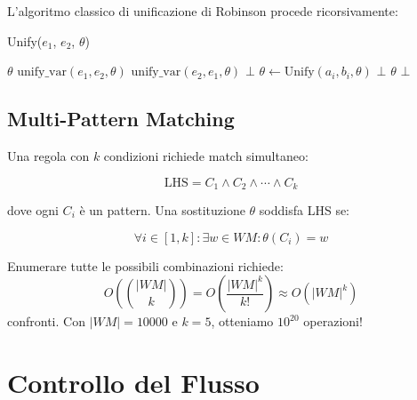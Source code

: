 L'algoritmo classico di unificazione di Robinson procede ricorsivamente:

\begin{algorithm}[H]
\caption{Unify($e_1$, $e_2$, $\theta$)}
\begin{algorithmic}[1]
    \State \Return $\theta$ 
    \State \Return $\text{unify\_var}(e_1, e_2, \theta)$
    \State \Return $\text{unify\_var}(e_2, e_1, \theta)$
        \State \Return $\bot$ 
    \Else
            \State $\theta \gets \text{Unify}(a_i, b_i, \theta)$
            \If{$\theta = \bot$}
                \State \Return $\bot$
            \EndIf
        \EndFor
        \State \Return $\theta$
    \EndIf
\Else
    \State \Return $\bot$ 
\EndIf
\end{algorithmic}
\end{algorithm}

\subsection{Multi-Pattern Matching}

Una regola con $k$ condizioni richiede match simultaneo:

\begin{equation}
\text{LHS} = C_1 \land C_2 \land \cdots \land C_k
\end{equation}

dove ogni $C_i$ è un pattern. Una sostituzione $\theta$ soddisfa LHS se:

\begin{equation}
\forall i \in [1, k]: \exists w \in WM: \theta(C_i) = w
\end{equation}

\begin{osservazione}
Enumerare tutte le possibili combinazioni richiede:
\begin{equation}
O\left(\binom{|WM|}{k}\right) = O\left(\frac{|WM|^k}{k!}\right) \approx O(|WM|^k)
\end{equation}
confronti. Con $|WM| = 10000$ e $k = 5$, otteniamo $10^{20}$ operazioni!
\end{osservazione}

\section{Controllo del Flusso}

